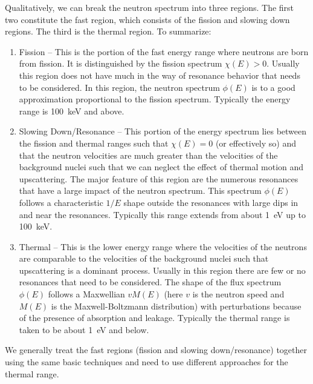 Qualitatively, we can break the neutron spectrum into three regions. The first two constitute the fast region, which consists of the fission and slowing down regions. The third is the thermal region. To summarize:
\begin{enumerate}
  \item Fission -- This is the portion of the fast energy range where neutrons are born from fission. It is distinguished by the fission spectrum $\chi(E) > 0$. Usually this region does not have much in the way of resonance behavior that needs to be considered. In this region, the neutron spectrum $\phi(E)$ is to a good approximation proportional to the fission spectrum. Typically the energy range is 100~keV and above.
  \item Slowing Down/Resonance -- This portion of the energy spectrum lies between the fission and thermal ranges such that $\chi(E) = 0$ (or effectively so) and that the neutron velocities are much greater than the velocities of the background nuclei such that we can neglect the effect of thermal motion and upscattering. The major feature of this region are the numerous resonances that have a large impact of the neutron spectrum. This spectrum $\phi(E)$ follows a characteristic $1/E$ shape outside the resonances with large dips in and near the resonances. Typically this range extends from about 1~eV up to 100~keV.
  \item Thermal -- This is the lower energy range where the velocities of the neutrons are comparable to the velocities of the background nuclei such that upscattering is a dominant process. Usually in this region there are few or no resonances that need to be considered. The shape of the flux spectrum $\phi(E)$ follows a Maxwellian $vM(E)$ (here $v$ is the neutron speed and $M(E)$ is the Maxwell-Boltzmann distribution) with perturbations because of the presence of absorption and leakage. Typically the thermal range is taken to be about 1~eV and below.
\end{enumerate}
We generally treat the fast regions (fission and slowing down/resonance) together using the same basic techniques and need to use different approaches for the thermal range.

